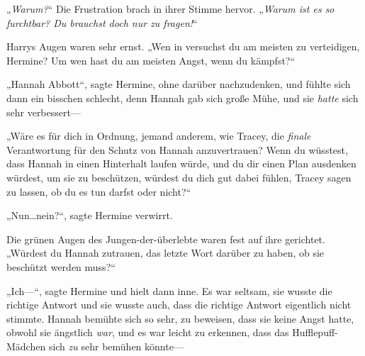 „\emph{Warum?}“ Die Frustration brach in ihrer Stimme hervor. „\emph{Warum ist es so furchtbar? Du brauchst doch nur zu fragen!}“

Harrys Augen waren sehr ernst. „Wen in \SPHEW versuchst du am meisten zu verteidigen, Hermine? Um wen hast du am meisten Angst, wenn du kämpfst?“

„Hannah Abbott“, sagte Hermine, ohne darüber nachzudenken, und fühlte sich dann ein bisschen schlecht, denn Hannah gab sich große Mühe, und sie \emph{hatte} sich sehr verbessert—

„Wäre es für dich in Ordnung, jemand anderem, wie Tracey, die \emph{finale} Verantwortung für den Schutz von Hannah anzuvertrauen? Wenn du wüsstest, dass Hannah in einen Hinterhalt laufen würde, und du dir einen Plan ausdenken würdest, um sie zu beschützen, würdest du dich gut dabei fühlen, Tracey sagen zu lassen, ob du es tun darfst oder nicht?“

„Nun…nein?“, sagte Hermine verwirrt.

Die grünen Augen des Jungen-der-überlebte waren fest auf ihre gerichtet. „Würdest du Hannah zutrauen, das letzte Wort darüber zu haben, ob sie beschützt werden muss?“

„Ich—“, sagte Hermine und hielt dann inne. Es war seltsam, sie wusste die richtige Antwort und sie wusste auch, dass die richtige Antwort eigentlich nicht stimmte. Hannah bemühte sich so sehr, zu beweisen, dass sie keine Angst hatte, obwohl sie ängstlich \emph{war}, und es war leicht zu erkennen, dass das Hufflepuff-Mädchen sich \emph{zu} sehr bemühen könnte—

